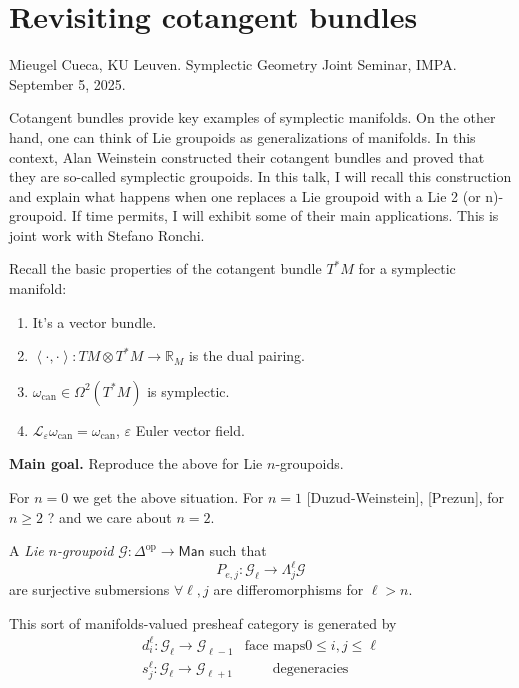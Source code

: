 {\section{Revisiting cotangent bundles}
\label{section-revisiting-cotangent-bundles}

\noindent
Mieugel Cueca, KU Leuven.
Symplectic Geometry Joint Seminar, IMPA. 
September 5, 2025.

 Cotangent bundles provide key examples of symplectic
manifolds. On the other hand, one can think of Lie groupoids as generalizations
of manifolds. In this context, Alan Weinstein constructed their cotangent
bundles and proved that they are so-called symplectic groupoids. In this talk, I
will recall this construction and explain what happens when one replaces a Lie
groupoid with a Lie 2 (or n)-groupoid. If time permits, I will exhibit some of
their main applications. This is joint work with Stefano Ronchi.

\medskip\noindent

Recall the basic properties of the cotangent
bundle $T^*M$ for a symplectic manifold:
\begin{enumerate}
\item It's a vector bundle.
\item $\left<\cdot,\cdot\right>:TM \otimes T^*M \to \mathbb{R}_M$ 
is the dual pairing.
\item $\omega_{\text{can}}\in \Omega^2(T^*M)$ is symplectic.
\item $\mathcal{L}_\varepsilon \omega_{\text{can}}=\omega_{\text{can}}$,
$\varepsilon$ Euler vector field.
\end{enumerate}

\medskip\noindent
{\bf Main goal.} Reproduce the above for Lie $n$-groupoids.

For $n=0$ we get the above situation. For $n=1$ [Duzud-Weinstein], [Prezun],
for $n\geq 2$ ? and we care about $n=2$.

\begin{definition}
\label{definition-groupoid}
A {\it Lie $n$-groupoid} $\mathcal{G}:\Delta^{\text{op}}\to \mathsf{Man}$ 
such that
$$
P_{e,j}:\mathcal{G}_{\ell}\to \Lambda_j^\ell \mathcal{G}
$$
are surjective submersions $\forall  \ell,j$ 
are differomorphisms for $\ell > n$.
\end{definition}

\begin{remark}
\label{remark-generators}
This sort of manifolds-valued presheaf category is generated by
\begin{align*}
d_i^\ell:\mathcal{G}_\ell \to \mathcal{G}_{\ell-1}&\text{face maps}
0 \leq  i,j \leq  \ell\\
s_j^\ell:\mathcal{G}_\ell \to \mathcal{G}_{\ell+1}&  \qquad \text{degeneracies}
\end{align*}
\end{remark}

}
